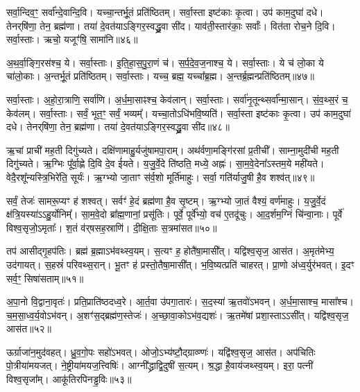    सर्वा॒न्दिव॒ꣳ॒ सर्वा᳚न्दे॒वान्दि॒वि।
   यच्चा॒न्तर्भू॒तं प्रति॑ष्ठितम्।
   सर्वा॒स्ता इष्ट॑काः कृ॒त्वा।
   उप॑ काम॒दुघा॑ दधे।
   तेनर्‌षि॑णा॒ तेन॒ ब्रह्म॑णा।
   तया॑ दे॒वत॑याऽङ्गिर॒स्वद्ध्रु॒वा सी॑द।
   याव॑ती॒स्तार॑काः॒ सर्वाः᳚।
   वित॑ता रोच॒ने दि॒वि।
   सर्वा॒स्ताः।
   ऋचो॒ यजूꣳ॑षि॒ सामा॑नि॥४६॥

   अ॒थ॒र्वा॒ङ्गि॒रस॑श्च॒ ये।
   सर्वा॒स्ताः।
   इ॒ति॒हा॒स॒पु॒रा॒णं च॑।
   स॒र्प॒दे॒व॒ज॒नाश्च॒ ये।
   सर्वा॒स्ताः।
   ये च॑ लो॒का ये चा॑लो॒काः।
   अ॒न्तर्भू॒तं प्रति॑ष्ठितम्।
   सर्वा॒स्ताः।
   यच्च॒ ब्रह्म॒ यच्चा᳚ब्र॒ह्म।
   अ॒न्तर्ब्र॒ह्मन्प्रति॑ष्ठितम्॥४७॥

   सर्वा॒स्ताः।
   अ॒हो॒रा॒त्राणि॒ सर्वा॑णि।
   अ॒र्ध॒मा॒साꣴश्च॒ केव॑लान्।
   सर्वा॒स्ताः।
   सर्वा॑नृ॒तून्थ्सर्वा᳚न्मा॒सान्।
   सं॒व॒थ्स॒रं च॒ केव॑लम्।
   सर्वा॒स्ताः।
   सर्वं॒ भूत॒ꣳ॒ सर्वं॒ भव्यम्᳚।
   यच्चा॒तोऽधि॑भवि॒ष्यति॑।
   सर्वा॒स्ता इष्ट॑काः कृ॒त्वा।
   उप॑ काम॒दुघा॑ दधे।
   तेनर्‌षि॑णा॒ तेन॒ ब्रह्म॑णा।
   तया॑ दे॒वत॑याऽङ्गिर॒स्वद्ध्रु॒वा सी॑द॥४८॥
\anuvakamend
  
   ऋ॒चां प्राची॑ मह॒ती दिगु॑च्यते।
   दक्षि॑णामाहु॒र्यजु॑षामपा॒राम्।
   अथ॑र्वणा॒मङ्गि॑रसां प्र॒तीची᳚।
   साम्ना॒मुदी॑ची मह॒ती दिगु॑च्यते।
   ऋ॒ग्भिः पू᳚र्वा॒ह्णे दि॒वि दे॒व ई॑यते।
   य॒जु॒र्वे॒दे ति॑ष्ठति॒ मध्ये॒ अह्नः॑।
   सा॒म॒वे॒देना᳚ऽस्तम॒ये मही॑यते।
   वेदै॒रशू᳚न्यस्त्रि॒भिरे॑ति॒ सूर्यः॑।
   ऋ॒ग्भ्यो जा॒ताꣳ स॑र्व॒शो मूर्ति॑माहुः।
   सर्वा॒ गति॑र्याजु॒षी है॒व शश्व॑त्॥४९॥

   सर्वं॒ तेजः॑ सामरू॒प्यꣳ ह॑ शश्वत्।
   सर्वꣳ॑ हे॒दं ब्रह्म॑णा है॒व सृ॒ष्टम्।
   ऋ॒ग्भ्यो जा॒तं वैश्यं॒ वर्ण॑माहुः।
   य॒जु॒र्वे॒दं क्ष॑त्रि॒यस्या॑ऽऽहु॒र्योनिम्᳚।
   सा॒म॒वे॒दो ब्रा᳚ह्म॒णानां॒ प्रसू॑तिः।
   पूर्वे॒ पूर्वे᳚भ्यो॒ वच॑ ए॒तदू॑चुः।
   आ॒द॒र्\mbox{}शम॒ग्निं चि॑न्वा॒नाः।
   पूर्वे॑ विश्व॒सृजो॒ऽमृताः᳚।
   श॒तं व॑र्‌षसह॒स्राणि॑।
   दी॒क्षि॒ताः स॒त्रमा॑सत॥५०॥

   तप॑ आसीद्गृ॒हप॑तिः।
   ब्रह्म॑ ब्र॒ह्माऽभ॑वथ्स्व॒यम्।
   स॒त्यꣳ ह॒ होतै॑षा॒मासी᳚त्।
   यद्वि॑श्व॒सृज॒ आस॑त।
   अ॒मृत॑मेभ्य॒ उद॑गायत्।
   स॒हस्रं॑ परिवथ्स॒रान्।
   भू॒तꣳ ह॑ प्रस्तो॒तैषा॒मासी᳚त्।
   भ॒वि॒ष्यत्प्रति॑ चाहरत्।
   प्रा॒णो अ॑ध्व॒र्युर॑भवत्।
   इ॒दꣳ सर्व॒ꣳ॒ सिषा॑सताम्॥५१॥

   अ॒पा॒नो वि॒द्वाना॒वृतः॑।
   प्रति॒प्राति॑ष्ठदध्व॒रे।
   आ॒र्त॒वा उ॑पगा॒तारः॑।
   स॒द॒स्या॑ ऋ॒तवो॑ऽभवन्।
   अ॒र्ध॒मा॒साश्च॒ मासा᳚श्च।
   च॒म॒सा॒ध्व॒र्य॒वोऽभ॑वन्।
   अ॒शꣳ॑स॒द्ब्रह्म॑ण॒स्तेजः॑।
   अ॒च्छा॒वा॒कोऽभ॑व॒द्यशः॑।
   ऋ॒तमे॑षां प्रशा॒स्ताऽऽसी᳚त्।
   यद्वि॑श्व॒सृज॒ आस॑त॥५२॥

   ऊर्ग्राजा॑न॒मुद॑वहत्।
   ध्रु॒व॒गो॒पः सहो॑ऽभवत्।
   ओजो॒ऽभ्य॑ष्टौ॒\-द्ग्राव्ण्णः॑।
   यद्वि॑श्व॒सृज॒ आस॑त।
   अप॑चितिः पो॒त्रीया॑मयजत्।
   ने॒ष्ट्रीया॑म\-यज॒त्त्विषिः॑।
   आग्नी᳚द्ध्राद्वि॒दुषी॑ स॒त्यम्।
   श्र॒द्धा है॒वाय॑जथ्स्व॒यम्।
   इरा॒ पत्नी॑ विश्व॒सृजा᳚म्।
   आकू॑तिरपिन\-ड्ढ॒विः॥५३॥

